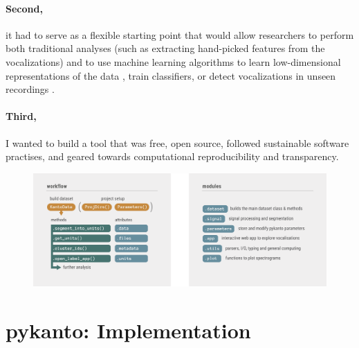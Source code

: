 \paragraph{Second,} it had to serve as a flexible starting point that would allow researchers to perform both traditional analyses (such as extracting hand-picked
features from the vocalizations) and to use machine learning algorithms to learn
low-dimensional representations of the data \parencite{goffinet2021, kollmorgen2020,
morfi2021, sainburg2020}, train classifiers, or detect vocalizations in unseen
recordings \parencite{cohen2022, kahl2021, stowell2014}.

\paragraph{Third,} I wanted to build a tool that was free, open source, followed
sustainable software practises, and geared towards computational
reproducibility and transparency.

\begin{figure}[bh!]
    \centering
    \includegraphics[width=\textwidth]{figures/chapter_2/fig2.pdf}
    \label{fig:structure}
\end{figure}

\section{pykanto: Implementation}

